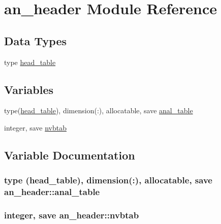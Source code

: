 \hypertarget{namespacean__header}{}\section{an\+\_\+header Module Reference}
\label{namespacean__header}
\subsection*{Data Types}
\begin{DoxyCompactItemize}
\item 
type \hyperlink{structan__header_1_1head__table}{head\+\_\+table}
\end{DoxyCompactItemize}
\subsection*{Variables}
\begin{DoxyCompactItemize}
\item 
type(\hyperlink{structan__header_1_1head__table}{head\+\_\+table}), dimension(\+:), allocatable, save \hyperlink{namespacean__header_ae5d3cd005b4f936e39d8ca9572fad953}{anal\+\_\+table}
\item 
integer, save \hyperlink{namespacean__header_a1f6702c906713337344986a86e036d55}{nvbtab}
\end{DoxyCompactItemize}


\subsection{Variable Documentation}
\hypertarget{namespacean__header_ae5d3cd005b4f936e39d8ca9572fad953}{}
\subsubsection[{anal\+\_\+table}]{\setlength{\rightskip}{0pt plus 5cm}type ({\bf head\+\_\+table}), dimension(\+:), allocatable, save an\+\_\+header\+::anal\+\_\+table}\label{namespacean__header_ae5d3cd005b4f936e39d8ca9572fad953}
\hypertarget{namespacean__header_a1f6702c906713337344986a86e036d55}{}
\subsubsection[{nvbtab}]{\setlength{\rightskip}{0pt plus 5cm}integer, save an\+\_\+header\+::nvbtab}\label{namespacean__header_a1f6702c906713337344986a86e036d55}
